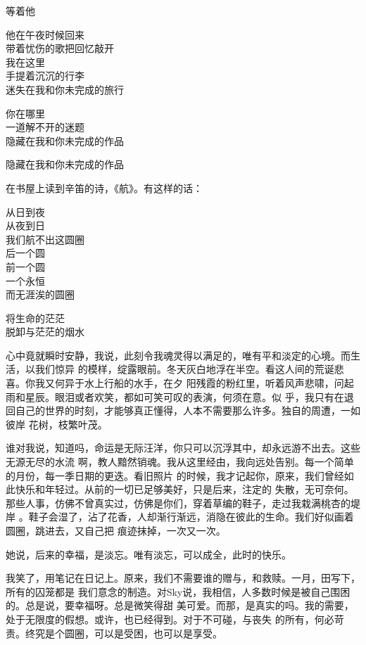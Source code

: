 \documentclass[12pt,a4paper]{article}
\begin{document}
		等着他

		他在午夜时候回来 \\
		带着忧伤的歌把回忆敲开 \\
		我在这里 \\
		手提着沉沉的行李 \\
		迷失在我和你未完成的旅行

		你在哪里 \\
		一道解不开的迷题 \\
		隐藏在我和你未完成的作品

		隐藏在我和你未完成的作品
		\endlongpoem

	\endwriting



		在书屋上读到辛笛的诗，《航》。有这样的话：

		\longpoem{}{}{}
		从日到夜 \\
		从夜到日 \\
		我们航不出这圆圈 \\
		后一个圆 \\
		前一个圆 \\
		一个永恒 \\
		而无涯涘的圆圈

		将生命的茫茫 \\
		脱卸与茫茫的烟水
		\endlongpoem


		心中竟就瞬时安静，我说，此刻令我魂灵得以满足的，唯有平和淡定的心境。而生活，以我们惊异
	的模样，绽露眼前。冬天灰白地浮在半空。看这人间的荒诞悲喜。你我又何异于水上行船的水手，在夕
	阳残霞的粉红里，听着风声悲啸，问起雨和星辰。眼泪或者欢笑，都如可笑可叹的表演，何须在意。似
	乎，我只有在退回自己的世界的时刻，才能够真正懂得，人本不需要那么许多。独自的周遭，一如彼岸
	花树，枝繁叶茂。


		谁对我说，知道吗，命运是无际汪洋，你只可以沉浮其中，却永远游不出去。这些无源无尽的水流
	啊，教人黯然销魂。我从这里经由，我向远处告别。每一个简单的月份，每一季日期的更迭。看旧照片
	的时候，我才记起你，原来，我们曾经如此快乐和年轻过。从前的一切已足够美好，只是后来，注定的
	失散，无可奈何。那些人事，仿佛不曾真实过，仿佛是你们，穿着草编的鞋子，走过我栽满桃杏的堤岸
	。鞋子会湿了，沾了花香，人却渐行渐远，消隐在彼此的生命。我们好似画着圆圈，跳进去，又自己把
	痕迹抹掉，一次又一次。


		她说，后来的幸福，是淡忘。唯有淡忘，可以成全，此时的快乐。

		我笑了，用笔记在日记上。原来，我们不需要谁的赠与，和救赎。一月，田写下，所有的囚笼都是
	我们意念的制造。对Sky说，我相信，人多数时候是被自己围困的。总是说，要幸福呀。总是微笑得甜
	美可爱。而那，是真实的吗。我的需要，处于无限度的假想。或许，也已经得到。对于不可碰，与丧失
	的所有，何必苛责。终究是个圆圈，可以是受困，也可以是享受。
\end{document}
